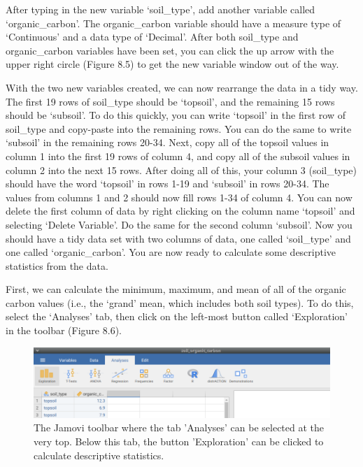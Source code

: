\documentclass[
]{scrbook}
\begin{document}
After typing in the new variable `soil\_type', add another variable called `organic\_carbon'.
The organic\_carbon variable should have a measure type of `Continuous' and a data type of `Decimal'.
After both soil\_type and organic\_carbon variables have been set, you can click the up arrow with the upper right circle (Figure 8.5) to get the new variable window out of the way.

With the two new variables created, we can now rearrange the data in a tidy way.
The first 19 rows of soil\_type should be `topsoil', and the remaining 15 rows should be `subsoil'.
To do this quickly, you can write `topsoil' in the first row of soil\_type and copy-paste into the remaining rows.
You can do the same to write `subsoil' in the remaining rows 20-34.
Next, copy all of the topsoil values in column 1 into the first 19 rows of column 4, and copy all of the subsoil values in column 2 into the next 15 rows.
After doing all of this, your column 3 (soil\_type) should have the word `topsoil' in rows 1-19 and `subsoil' in rows 20-34.
The values from columns 1 and 2 should now fill rows 1-34 of column 4.
You can now delete the first column of data by right clicking on the column name `topsoil' and selecting `Delete Variable'.
Do the same for the second column `subsoil'.
Now you should have a tidy data set with two columns of data, one called `soil\_type' and one called `organic\_carbon'.
You are now ready to calculate some descriptive statistics from the data.

First, we can calculate the minimum, maximum, and mean of all of the organic carbon values (i.e., the `grand' mean, which includes both soil types).
To do this, select the `Analyses' tab, then click on the left-most button called `Exploration' in the toolbar (Figure 8.6).

\begin{figure}
\includegraphics[width=1\linewidth]{img/jamovi_exploration} \caption{The Jamovi toolbar where the tab 'Analyses' can be selected at the very top. Below this tab, the button 'Exploration' can be clicked to calculate descriptive statistics.}\label{fig:unnamed-chunk-26}
\end{figure}
\end{document}
